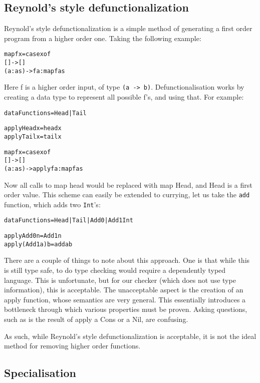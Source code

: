\documentclass[preprint]{sigplanconf}
\newcommand{\T}[1]{\texttt{#1}}
\newenvironment{code}{\begin{alltt}\small}{\end{alltt}}
\begin{document}
\subsection{Reynold's style defunctionalization}

Reynold's style defunctionalization is a simple method of generating a first
order program from a higher order one. Taking the following example:

\begin{code}
 map f x = case x of
                [] -> []
                (a:as) -> f a : map f as
\end{code}

Here f is a higher order input, of type \T{(a -> b)}. Defunctionalisation works
by creating a data type to represent all possible f's, and using that. For
example:

\begin{code}
 data Functions = Head | Tail

 apply Head x = head x
 apply Tail x = tail x

 map f x = case x of
     [] -> []
     (a:as) -> apply f a : map f as
\end{code}

Now all calls to map head would be replaced with map Head, and Head is a first
order value. This scheme can easily be extended to currying, let us take the
\T{add} function, which adds two \T{Int}'s:

\begin{code}
 data Functions = Head | Tail | Add0 | Add1 Int

 apply Add0 n = Add1 n
 apply (Add1 a) b = add a b
\end{code}

There are a couple of things to note about this approach. One is that while
this is still type safe, to do type checking would require a dependently typed
language. This is unfortunate, but for our checker (which does not use type
information), this is acceptable. The unacceptable aspect is the creation of an
apply function, whose semantics are very general. This essentially introduces a
bottleneck through which various properties must be proven. Asking questions,
such as is the result of apply a Cons or a Nil, are confusing.

As such, while Reynold's style defunctionalization is acceptable, it is not the
ideal method for removing higher order functions.

\subsection{Specialisation}
\end{document}
